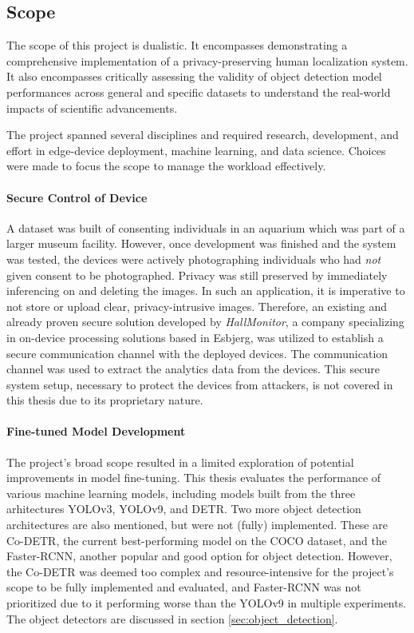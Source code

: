 \newpage
\subsection{Scope}
The scope of this project is dualistic. It encompasses demonstrating a comprehensive implementation of a privacy-preserving human localization system. It also encompasses critically assessing the validity of object detection model performances across general and specific datasets to understand the real-world impacts of scientific advancements.

The project spanned several disciplines and required research, development, and effort in edge-device deployment, machine learning, and data science. Choices were made to focus the scope to manage the workload effectively.

\paragraph{Secure Control of Device}
\label{sec:scope_ssh}
A dataset was built of consenting individuals in an aquarium which was part of a larger museum facility. However, once development was finished and the system was tested, the devices were actively photographing individuals who had \textit{not} given consent to be photographed. Privacy was still preserved by immediately inferencing on and deleting the images. In such an application, it is imperative to not store or upload clear, privacy-intrusive images. Therefore, an existing and already proven secure solution developed by \textit{HallMonitor}, a company specializing in on-device processing solutions based in Esbjerg, was utilized to establish a secure communication channel with the deployed devices. The communication channel was used to extract the analytics data from the devices. This secure system setup, necessary to protect the devices from attackers, is not covered in this thesis due to its proprietary nature.

\paragraph{Fine-tuned Model Development}
The project's broad scope resulted in a limited exploration of potential improvements in model fine-tuning. This thesis evaluates the performance of various machine learning models, including models built from the three arhitectures YOLOv3, YOLOv9, and DETR. Two more object detection architectures are also mentioned, but were not (fully) implemented. These are Co-DETR, the current best-performing model on the COCO dataset, and the Faster-RCNN, another popular and good option for object detection. However, the Co-DETR was deemed too complex and resource-intensive for the project's scope to be fully implemented and evaluated, and Faster-RCNN was not prioritized due to it performing worse than the YOLOv9 in multiple experiments. The object detectors are discussed in section \ref{sec:object_detection}.

